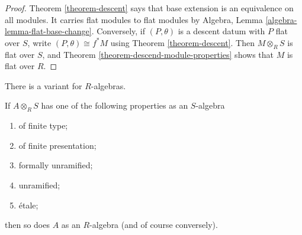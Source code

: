\begin{proof}
Theorem \ref{theorem-descent} says that base extension is an equivalence on
all modules. It carries flat modules to flat modules by Algebra, Lemma
\ref{algebra-lemma-flat-base-change}. Conversely, if $(P, \theta)$ is a
descent datum with $P$ flat over $S$, write
$(P, \theta) \cong f^*M$ using Theorem \ref{theorem-descent}. Then
$M \otimes_R S$ is flat over $S$, and Theorem
\ref{theorem-descend-module-properties} shows that $M$ is flat over $R$.
\end{proof}

\noindent
There is a variant for $R$-algebras.

\begin{theorem}
\label{theorem-descend-algebra-properties}
If $A \otimes_R S$ has one of the following properties as an $S$-algebra
\begin{enumerate}
\item[(a)]
of finite type;
\item[(b)]
of finite presentation;
\item[(c)]
formally unramified;
\item[(d)]
unramified;
\item[(e)]
\'etale;
\end{enumerate}
then so does $A$ as an $R$-algebra (and of course conversely).
\end{theorem}


